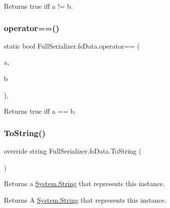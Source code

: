 Returns true iff a != b. 

\mbox{\label{class_full_serializer_1_1fs_data_a0cfc078433d539f5aefc16078accfc15}} 
\subsubsection{\texorpdfstring{operator==()}{operator==()}}
{\footnotesize\ttfamily static bool Full\+Serializer.\+fs\+Data.\+operator== (\begin{DoxyParamCaption}\item[{\hyperlink{class_full_serializer_1_1fs_data}{fs\+Data}}]{a,  }\item[{\hyperlink{class_full_serializer_1_1fs_data}{fs\+Data}}]{b }\end{DoxyParamCaption})\hspace{0.3cm}{\ttfamily [inline]}, {\ttfamily [static]}}



Returns true iff a == b. 

\mbox{\label{class_full_serializer_1_1fs_data_ac64cd3d8fa914d376259ff913c208791}} 
\subsubsection{\texorpdfstring{To\+String()}{ToString()}}
{\footnotesize\ttfamily override string Full\+Serializer.\+fs\+Data.\+To\+String (\begin{DoxyParamCaption}{ }\end{DoxyParamCaption})\hspace{0.3cm}{\ttfamily [inline]}}



Returns a \hyperlink{namespace_full_serializer_a6eee33d63b94e40fdfcfc59af9fcfc82a27118326006d3829667a400ad23d5d98}{System.\+String} that represents this instance. 

\begin{DoxyReturn}{Returns}
A \hyperlink{namespace_full_serializer_a6eee33d63b94e40fdfcfc59af9fcfc82a27118326006d3829667a400ad23d5d98}{System.\+String} that represents this instance.
\end{DoxyReturn}


